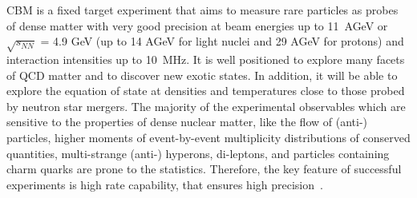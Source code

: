 \gls{CBM} is a fixed target experiment that aims to measure rare particles as probes of dense matter with very good precision at beam energies up to 11~AGeV or $\sqrt{s_{NN}}$ = 4.9 GeV (up to 14 AGeV for light nuclei and 29 AGeV for protons) and interaction intensities up to 10~MHz.
\newpage
It is well positioned to explore many facets of \gls{QCD} matter and to discover new exotic states. In addition, it will be able to explore the equation of state at densities and temperatures close to those probed by neutron star mergers. The majority of the experimental observables which are sensitive to the properties of dense nuclear matter, like the flow of (anti-) particles, higher moments of event-by-event multiplicity distributions of conserved quantities, multi-strange (anti-) hyperons, di-leptons, and particles containing charm quarks are prone to the statistics. Therefore, the key feature of successful experiments is high rate capability, that ensures high precision~\cite{Ablyazimov_2017}. 

